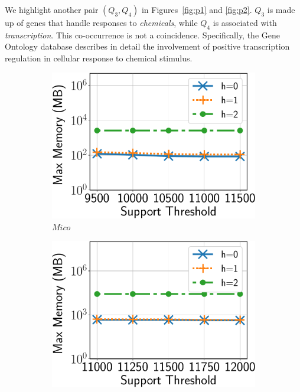 We highlight another pair $(Q_3,Q_4)$ in Figures~\ref{fig:p1} and \ref{fig:p2}.
$Q_3$ is  made up of genes that handle responses to {\em chemicals}, while $Q_4$ is
associated with {\em transcription}. This co-occurrence is not a coincidence. Specifically, the Gene Ontology\cite{pattern3} database
 describes in detail the involvement of positive transcription
regulation in cellular response to chemical stimulus. %
%
\begin{figure}[b]
	\centering
	\begin{subfigure}[b]{0.25\textwidth}
		\includegraphics[scale=0.24]{img2/mico/mico_mem_hops.pdf}
		\caption{\scriptsize $Mico$}
		\label{fig:mico_mem_hops}
	\end{subfigure}%
	\hspace*{\fill}
	\begin{subfigure}[b]{0.25\textwidth}
		\includegraphics[scale=0.24]{img2/coauthordblp/coauthordblp_mem_hops.pdf}

\end{subfigure}
\end{figure}
